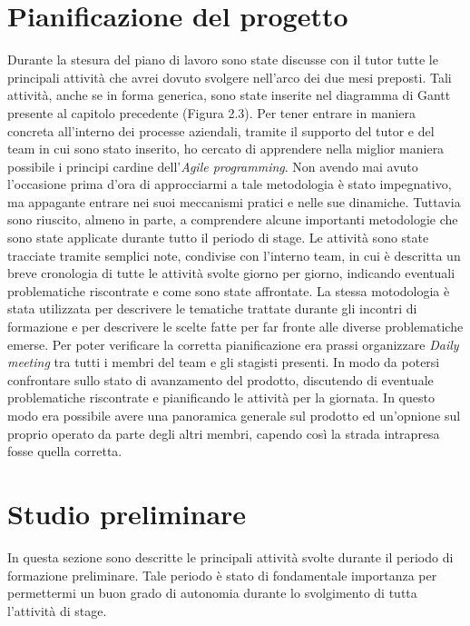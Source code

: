 \section{Pianificazione del progetto}
Durante la stesura del piano di lavoro sono state discusse con il tutor tutte le principali attività che avrei dovuto svolgere nell'arco dei due mesi preposti. Tali attività, anche se in forma generica, sono state inserite nel diagramma di Gantt presente al capitolo precedente (Figura 2.3).
Per tener entrare in maniera concreta all'interno dei processe aziendali, tramite il supporto del tutor e del team in cui sono stato inserito, ho cercato di apprendere nella miglior maniera possibile i principi cardine dell'\textit{Agile programming}. Non avendo mai avuto l'occasione prima d'ora di approcciarmi a tale metodologia è stato impegnativo, ma appagante entrare nei suoi meccanismi pratici e nelle sue dinamiche. Tuttavia sono riuscito, almeno in parte, a comprendere alcune importanti metodologie che sono state applicate durante tutto il periodo di stage. Le attività sono state tracciate tramite semplici note, condivise con l'interno team, in cui è descritta un breve cronologia di tutte le attività svolte giorno per giorno, indicando eventuali problematiche riscontrate e come sono state affrontate. La stessa motodologia è stata utilizzata per descrivere le tematiche trattate durante gli incontri di formazione e per descrivere le scelte fatte per far fronte alle diverse problematiche emerse.
Per poter verificare la corretta pianificazione era prassi organizzare \textit{Daily meeting} tra tutti i membri del team e gli stagisti presenti. In modo da potersi confrontare sullo stato di avanzamento del prodotto, discutendo di eventuale problematiche riscontrate e pianificando le attività per la giornata. In questo modo era possibile avere una panoramica generale sul prodotto ed un'opnione sul proprio operato da parte degli altri membri, capendo così la strada intrapresa fosse quella corretta.
\section{Studio preliminare}
In questa sezione sono descritte le principali attività svolte durante il periodo di formazione preliminare. Tale periodo è stato di fondamentale importanza per permettermi un buon grado di autonomia durante lo svolgimento di tutta l'attività di stage.
